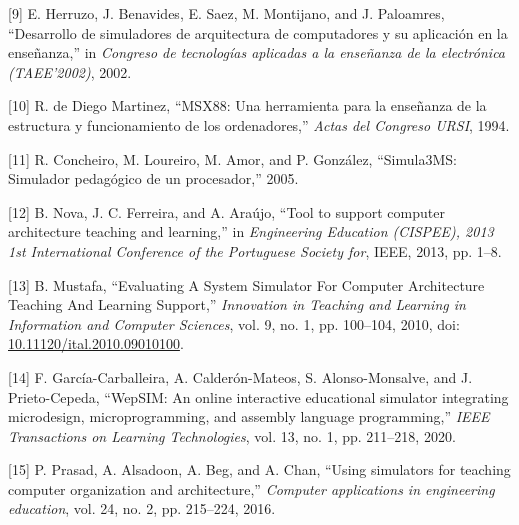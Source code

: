 \documentclass[12pt,oneside]{templates/unerthesis}
\newcommand{\CSLLeftMargin}[1]{#1} %
\newcommand{\CSLRightInline}[1]{#1} %
\newlength{\cslhangindent}
\newenvironment{CSLReferences}[2] %
 {\setlength{\parindent}{0pt}%
  \setlength{\leftskip}{#1 pt\relax}%
  \setlength{\parskip}{#2 pt\relax}%
  \everypar{\setlength{\hangindent}{\cslhangindent}}}
 {\par}
\begin{document}
\begin{CSLReferences}{0}{0}
\leavevmode{}%
\CSLLeftMargin{{[}9{]} }%
\CSLRightInline{E. Herruzo, J. Benavides, E. Saez, M. Montijano, and J. Paloamres, {``Desarrollo de simuladores de arquitectura de computadores y su aplicación en la enseñanza,''} in \emph{Congreso de tecnologías aplicadas a la enseñanza de la electrónica (TAEE'2002)}, 2002.}

\leavevmode{}%
\CSLLeftMargin{{[}10{]} }%
\CSLRightInline{R. de Diego Martinez, {``MSX88: Una herramienta para la enseñanza de la estructura y funcionamiento de los ordenadores,''} \emph{Actas del Congreso URSI}, 1994.}

\leavevmode{}%
\CSLLeftMargin{{[}11{]} }%
\CSLRightInline{R. Concheiro, M. Loureiro, M. Amor, and P. González, {``Simula3MS: Simulador pedagógico de un procesador,''} 2005.}

\leavevmode{}%
\CSLLeftMargin{{[}12{]} }%
\CSLRightInline{B. Nova, J. C. Ferreira, and A. Araújo, {``Tool to support computer architecture teaching and learning,''} in \emph{Engineering {Education} ({CISPEE}), 2013 1st {International} {Conference} of the {Portuguese} {Society} for}, IEEE, 2013, pp. 1--8.}

\leavevmode{}%
\CSLLeftMargin{{[}13{]} }%
\CSLRightInline{B. Mustafa, {``Evaluating {A} {System} {Simulator} {For} {Computer} {Architecture} {Teaching} {And} {Learning} {Support},''} \emph{Innovation in Teaching and Learning in Information and Computer Sciences}, vol. 9, no. 1, pp. 100--104, 2010, doi: \href{https://doi.org/10.11120/ital.2010.09010100}{10.11120/ital.2010.09010100}.}

\leavevmode{}%
\CSLLeftMargin{{[}14{]} }%
\CSLRightInline{F. García-Carballeira, A. Calderón-Mateos, S. Alonso-Monsalve, and J. Prieto-Cepeda, {``WepSIM: An online interactive educational simulator integrating microdesign, microprogramming, and assembly language programming,''} \emph{IEEE Transactions on Learning Technologies}, vol. 13, no. 1, pp. 211--218, 2020.}

\leavevmode{}%
\CSLLeftMargin{{[}15{]} }%
\CSLRightInline{P. Prasad, A. Alsadoon, A. Beg, and A. Chan, {``Using simulators for teaching computer organization and architecture,''} \emph{Computer applications in engineering education}, vol. 24, no. 2, pp. 215--224, 2016.}


\end{CSLReferences}
\end{document}
